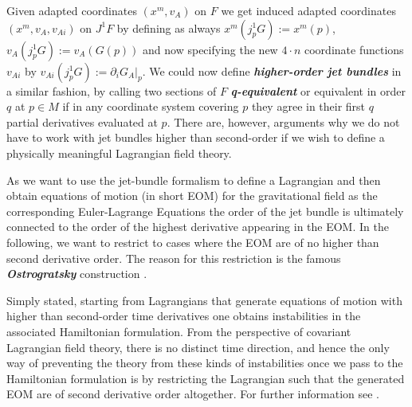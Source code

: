 \documentclass[a4paper,12pt, DIV=14, BCOR=5mm, twoside, headsepline, numbers=noenddot]{scrbook}
\begin{document}
Given adapted coordinates $(x^m,v_A)$ on $F$ we get induced adapted coordinates $(x^m, v_A, v_{Ai})$ on $J^1F$ by defining as always $x^m(j^1_pG) := x^m(p)$, $v_A(j^1_pG) := v_A(G(p))$ and now specifying the new $4 \cdot n$ coordinate functions $v_{Ai}$ by $v_{Ai}(j^1_pG) := \partial_iG_A \vert_p$.
We could now define \textit{\textbf{higher-order jet bundles}} in a similar fashion, by calling two sections of $F$ \textit{\textbf{q-equivalent}} or equivalent in order $q$ at $p \in M$ if in any coordinate system covering $p$ they agree in their first $q$ partial derivatives evaluated at $p$. There are, however, arguments why we do not have to work with jet bundles higher than second-order if we wish to define a physically meaningful Lagrangian field theory.

As we want to use the jet-bundle formalism to define a Lagrangian and then obtain equations of motion (in short EOM) for the gravitational field as the corresponding Euler-Lagrange Equations the order of the jet bundle is ultimately connected to the order of the highest derivative appearing in the EOM. In the following, we want to restrict to cases where the EOM are of no higher than second derivative order. The reason for this restriction is the famous \textbf{\textit{Ostrogratsky}} construction \cite{Ostrogradsky:1850fid}. 

Simply stated, starting from Lagrangians that generate equations of motion with higher than second-order time derivatives one obtains instabilities in the associated Hamiltonian formulation. From the perspective of covariant Lagrangian field theory, there is no distinct time direction, and hence the only way of preventing the theory from these kinds of instabilities once we pass to the Hamiltonian formulation is by restricting the Lagrangian such that the generated EOM are of second derivative order altogether. For further information see \cite{2015arXiv150602210W}. 
\end{document}
